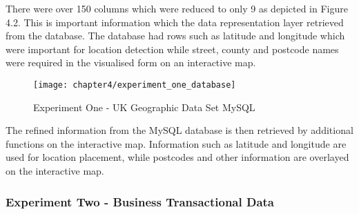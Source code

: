 
There were over 150 columns which were reduced to only 9 as depicted in Figure 4.2. This is  important information which  the data representation layer retrieved from the database. The database had rows such as latitude and longitude which were important for location detection while street, county and postcode names were required in the visualised form on an interactive map.


\begin{figure}[H]
\centering
\texttt{[image: chapter4/experiment\_one\_database]}
\caption{Experiment One - UK Geographic Data Set MySQL}
\end{figure}

The refined information from the MySQL database is then retrieved by additional functions on the interactive map. Information such as latitude and longitude are used for location placement, while postcodes and other information are overlayed on the interactive map.

\subsubsection{Experiment Two - Business Transactional Data}

